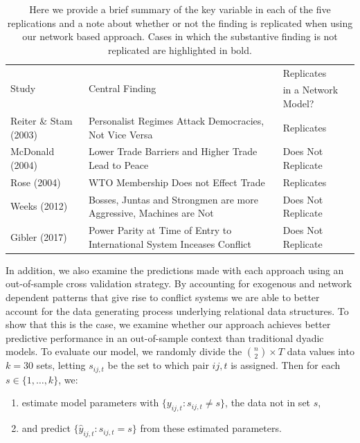 \begin{table}[ht]
\centering
\caption{Here we provide a brief summary of the key variable in each of the five replications and a note about whether or not the finding is replicated when using our network based approach. Cases in which the substantive finding is not replicated are highlighted in bold.}
\begin{tabular}{l p{7cm} l} \toprule
\multirow{2}{*}{Study} & \multirow{2}{*}{Central Finding} &  Replicates \\ 
	& &  in a Network Model? \\ \toprule
Reiter \& Stam (2003) & Personalist Regimes Attack Democracies, Not Vice Versa & {Replicates} \\ \midrule
McDonald (2004) & Lower Trade Barriers and Higher Trade Lead to Peace & {Does Not Replicate}\\ \midrule
Rose (2004) & WTO Membership Does not Effect Trade & {Replicates}\\ \midrule
Weeks (2012) & Bosses, Juntas and Strongmen are more Aggressive, Machines are Not & {Does Not Replicate} \\\midrule
Gibler (2017) & Power Parity at Time of Entry to International System Inceases Conflict & {Does Not Replicate} \\ \bottomrule
	\end{tabular}
			\label{tab:modelFindingSumm}
\end{table}

In addition, we also examine the predictions made with each approach using an out-of-sample cross validation strategy. By accounting for exogenous and network dependent patterns that give rise to conflict systems we are able to better account for the data generating process underlying relational data structures. To show that this is the case, we examine whether our approach achieves better predictive performance in an out-of-sample context than traditional dyadic models. To evaluate our model, we randomly divide the $\binom n 2 \times T$ data values into $k=30$ sets, letting $s_{ij,t}$ be the set to which pair $ij,t$ is assigned. Then for each $s \in \{1,\ldots,k\}$, we:

\begin{enumerate}
	\item estimate model parameters with $\{y_{ij,t}: s_{ij,t} \neq s\}$, the data not in set $s$,
	\item and predict $\{\hat{y}_{ij,t}: s_{ij,t} = s\}$ from these estimated parameters. 
\end{enumerate}


